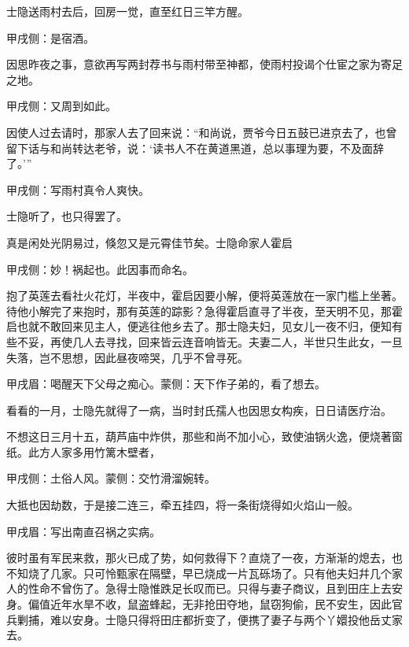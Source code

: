 \begin{parag}
    士隐送雨村去后，回房一觉，直至红日三竿方醒。\begin{note}甲戌侧：是宿酒。\end{note}因思昨夜之事，意欲再写两封荐书与雨村带至神都，使雨村投谒个仕宦之家为寄足之地。\begin{note}甲戌侧：又周到如此。\end{note}因使人过去请时，那家人去了回来说：“和尚说，贾爷今日五鼓已进京去了，也曾留下话与和尚转达老爷，说：‘读书人不在黄道黑道，总以事理为要，不及面辞了。’”\begin{note}甲戌侧：写雨村真令人爽快。\end{note}士隐听了，也只得罢了。
\end{parag}


\begin{parag}
    真是闲处光阴易过，倏忽又是元霄佳节矣。士隐命家人霍启\begin{note}甲戌侧：妙！祸起也。此因事而命名。\end{note}抱了英莲去看社火花灯，半夜中，霍启因要小解，便将英莲放在一家门槛上坐著。待他小解完了来抱时，那有英莲的踪影？急得霍启直寻了半夜，至天明不见，那霍启也就不敢回来见主人，便逃往他乡去了。那士隐夫妇，见女儿一夜不归，便知有些不妥，再使几人去寻找，回来皆云连音响皆无。夫妻二人，半世只生此女，一旦失落，岂不思想，因此昼夜啼哭，几乎不曾寻死。\begin{note}甲戌眉：喝醒天下父母之痴心。蒙侧：天下作子弟的，看了想去。\end{note}看看的一月，士隐先就得了一病，当时封氏孺人也因思女构疾，日日请医疗治。
\end{parag}


\begin{parag}
    不想这日三月十五，葫芦庙中炸供，那些和尚不加小心，致使油锅火逸，便烧著窗纸。此方人家多用竹篱木壁者，\begin{note}甲戌侧：土俗人风。蒙侧：交竹滑溜婉转。\end{note}大抵也因劫数，于是接二连三，牵五挂四，将一条街烧得如火焰山一般。\begin{note}甲戌眉：写出南直召祸之实病。\end{note}彼时虽有军民来救，那火已成了势，如何救得下？直烧了一夜，方渐渐的熄去，也不知烧了几家。只可怜甄家在隔壁，早已烧成一片瓦砾场了。只有他夫妇幷几个家人的性命不曾伤了。急得士隐惟跌足长叹而已。只得与妻子商议，且到田庄上去安身。偏值近年水旱不收，鼠盗蜂起，无非抢田夺地，鼠窃狗偷，民不安生，因此官兵剿捕，难以安身。士隐只得将田庄都折变了，便携了妻子与两个丫嬛投他岳丈家去。
\end{parag}


